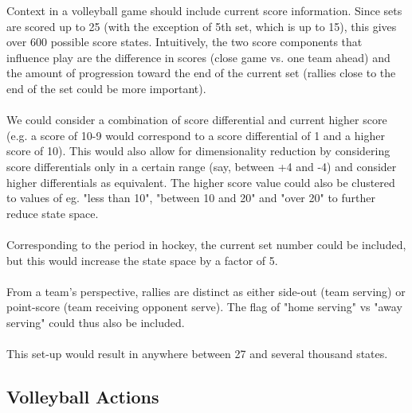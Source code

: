 \documentclass[12pt,letter]{article}
\begin{document}
	Context in a volleyball game should include current score information. Since sets are scored up to 25 (with the exception of 5th set, which is up to 15), this gives over 600 possible score states. Intuitively, the two score components that influence play are the difference in scores (close game vs. one team ahead) and the amount of progression toward the end of the current set (rallies close to the end of the set could be more important).\\\\
	We could consider a combination of score differential and current higher score (e.g. a score of 10-9 would correspond to a score differential of 1 and a higher score of 10). This would also allow for dimensionality reduction by considering score differentials only in a certain range (say, between +4 and -4) and consider higher differentials as equivalent. The higher score value could also be clustered to values of eg. "less than 10", "between 10 and 20" and "over 20" to further reduce state space.\\\\
	Corresponding to the period in hockey, the current set number could be included, but this would increase the state space by a factor of 5.\\\\
	From a team's perspective, rallies are distinct as either side-out (team serving) or point-score (team receiving opponent serve). The flag of "home serving" vs "away serving" could thus also be included.\\\\
	This set-up would result in anywhere between 27 and several thousand states.

	\subsection*{Volleyball Actions}
	
\end{document}
